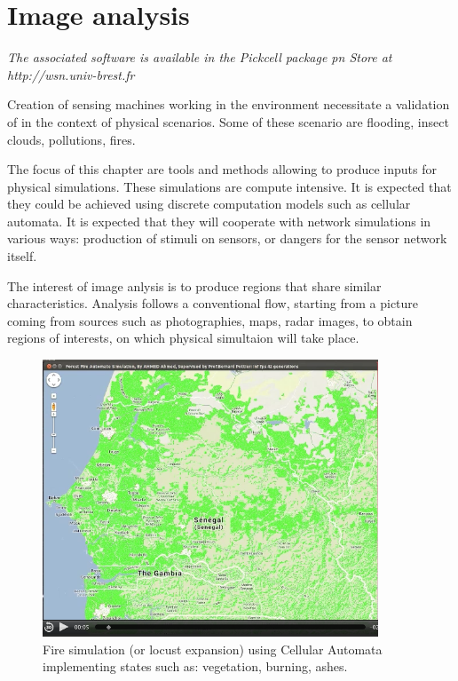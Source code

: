 
\chapter{Image analysis} 
 
{\sl The associated software is available in the Pickcell package pn Store at http://wsn.univ-brest.fr}


Creation of sensing machines working in the environment necessitate 
a validation of in the context of physical scenarios. Some of these 
scenario are flooding, insect clouds, pollutions, fires.

The focus of this chapter are tools and methods allowing to produce inputs
for physical  simulations. These simulations are compute intensive. It is expected
that they could be achieved using discrete computation models such as
cellular automata. It is expected that they will cooperate with network simulations
in various ways: production of stimuli on sensors, or dangers for the sensor network
itself.

The interest of image anlysis is to produce regions that share similar characteristics.
Analysis follows a conventional flow, starting from a picture coming from sources such as
photographies, maps, radar images, to obtain regions of interests, on which physical simultaion will
take place.


\begin{figure}[hbtp]
\begin{center} 
\includegraphics[width=10cm]{AhmedFire.png}
\caption{Fire simulation (or locust expansion) using Cellular Automata implementing  states such as:
vegetation, burning, ashes.}
\label{fig:AhmedFire}
\end{center}
\end{figure}

